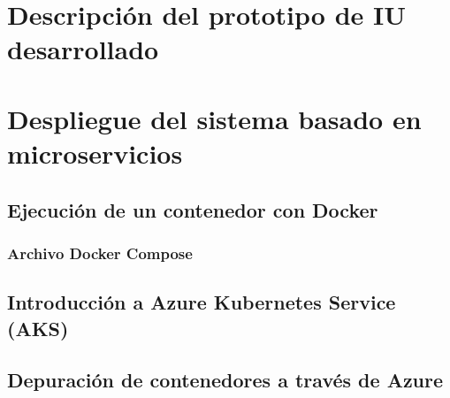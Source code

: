 \documentclass[11pt,spanish,listoffigures]{tfgetsinf}
\begin{document}
\chapter{Descripción del prototipo de IU desarrollado} \label{ch:ModeloNavegacion}

%
\chapter{Despliegue del sistema basado en microservicios}

\section{Ejecución de un contenedor con Docker}

\subsection{Archivo Docker Compose}

\section{Introducción a Azure Kubernetes Service (AKS)}

\section{Depuración de contenedores a través de Azure}
\end{document}
